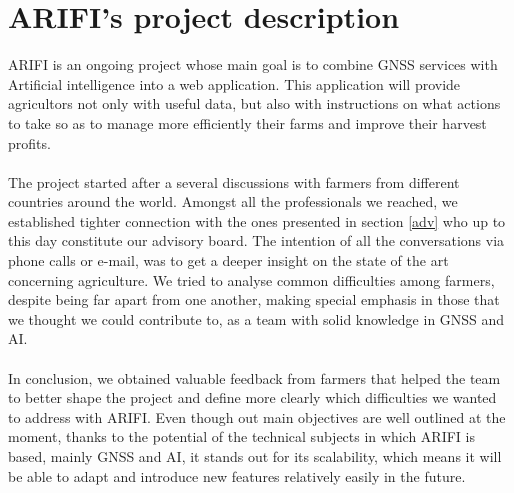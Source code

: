 \section{ARIFI's project description}

%
%
ARIFI is an ongoing project whose main goal is to combine GNSS services with Artificial intelligence into a web application. This application will provide agricultors not only with useful data, but also with instructions on what actions to take so as to manage more efficiently their farms and improve their harvest profits.\\\\
%
The project started after a several discussions with farmers from different countries around the world. Amongst all the professionals we reached, we established tighter connection with the ones presented in section \ref{adv} who up to this day constitute our advisory board. The intention of all the conversations via phone calls or e-mail, was to get a deeper insight on the state of the art concerning agriculture. We tried to analyse common difficulties among farmers, despite being far apart from one another, making special emphasis in those that we thought we could contribute to, as a team with solid knowledge in GNSS and AI.\\\\
%
%
In conclusion, we obtained valuable feedback from farmers that helped the team to better shape the project and define more clearly which difficulties we wanted to address with ARIFI. Even though out main objectives are well outlined at the moment, thanks to the potential of the technical subjects in which ARIFI is based, mainly GNSS and AI, it stands out for its scalability, which means it will be able to adapt and introduce new features relatively easily in the future.

